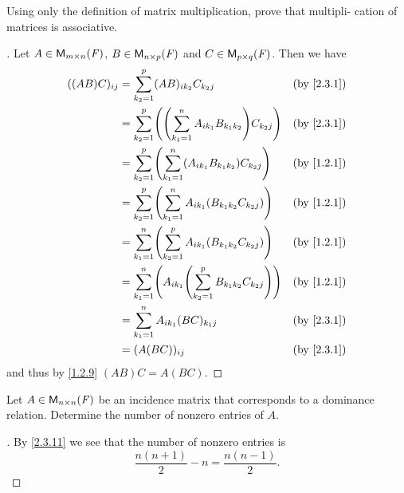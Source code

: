 \begin{ex}\label{ex:2.3.18}
  Using only the definition of matrix multiplication, prove that multipli- cation of matrices is associative.
\end{ex}

\begin{proof}[]
  Let \(A \in \ms\), \(B \in \ms[n][p][\F]\) and \(C \in \ms[p][q][\F]\).
  Then we have
  \begin{align*}
    ((AB) C)_{i j} & = \sum_{k_2 = 1}^p (AB)_{i k_2} C_{k_2 j}                                     &  & \by{2.3.1} \\
                   & = \sum_{k_2 = 1}^p \pa{\pa{\sum_{k_1 = 1}^n A_{i k_1} B_{k_1 k_2}} C_{k_2 j}} &  & \by{2.3.1} \\
                   & = \sum_{k_2 = 1}^p \pa{\sum_{k_1 = 1}^n (A_{i k_1} B_{k_1 k_2}) C_{k_2 j}}    &  & \by{1.2.1} \\
                   & = \sum_{k_2 = 1}^p \pa{\sum_{k_1 = 1}^n A_{i k_1} (B_{k_1 k_2} C_{k_2 j})}    &  & \by{1.2.1} \\
                   & = \sum_{k_1 = 1}^n \pa{\sum_{k_2 = 1}^p A_{i k_1} (B_{k_1 k_2} C_{k_2 j})}    &  & \by{1.2.1} \\
                   & = \sum_{k_1 = 1}^n \pa{A_{i k_1} \pa{\sum_{k_2 = 1}^p B_{k_1 k_2} C_{k_2 j}}} &  & \by{1.2.1} \\
                   & = \sum_{k_1 = 1}^n A_{i k_1} (BC)_{k_1 j}                                     &  & \by{2.3.1} \\
                   & = (A (BC))_{i j}                                                              &  & \by{2.3.1}
  \end{align*}
  and thus by \cref{1.2.9} \((AB) C = A (BC)\).
\end{proof}

\setcounter{ex}{22}
\begin{ex}\label{ex:2.3.23}
  Let \(A \in \ms[n][n][\F]\) be an incidence matrix that corresponds to a dominance relation.
  Determine the number of nonzero entries of \(A\).
\end{ex}

\begin{proof}[]
  By \cref{2.3.11} we see that the number of nonzero entries is
  \[
    \dfrac{n (n + 1)}{2} - n = \dfrac{n (n - 1)}{2}.
  \]
\end{proof}
